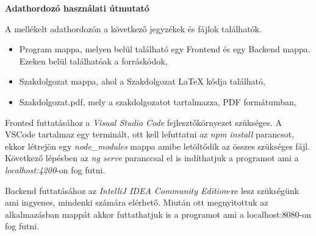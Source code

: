 \pagestyle{empty}

\noindent \textbf{\Large Adathordozó használati útmutató}

\vskip 1cm


A mellékelt adathordozón a következő jegyzékek és fájlok találhatók.

\begin{itemize}
\item Program mappa, melyen belül található egy Frontend és egy Backend mappa. Ezeken belül találhatóak a forráskódok,
\item Szakdolgozat mappa, ahol a Szakdolgozat LaTeX kódja található,
\item Szakdolgozat.pdf, mely a szakdolgozatot tartalmazza, PDF formátumban,
\end{itemize}

Fronted futtatásához a \textit{Visual Studio Code} fejlesztőkörnyezet szükséges. A VSCode tartalmaz egy terminált, ott kell lefuttatni az \textit{npm install} parancsot, ekkor létrejön egy \textit{node\_modules} mappa amibe letöltődik az összes szükséges fájl. Következő lépésben az \textit{ng serve} paranccsal el is indíthatjuk a programot ami a \textit{localhost:4200}-on fog futni.

Backend futtatásához az \textit{IntelliJ IDEA Community Edition}-re lesz szükségünk ami ingyenes, mindenki számára elérhető. Miután ott megnyitottuk az alkalmazásban mappát akkor futtathatjuk is a programot ami a {localhost:8080}-on fog futni.